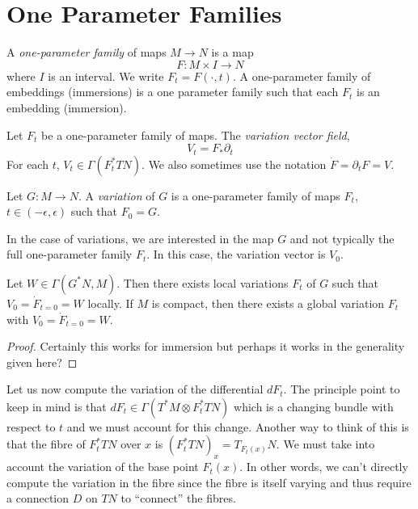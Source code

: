 \section{One Parameter Families}

\begin{defn}
A \emph{one-parameter family} of maps \(M \to N\) is a map
\[
F : M \times I \to N
\]
where \(I\) is an interval. We write \(F_t = F(\cdot, t)\). A one-parameter family of embeddings (immersions) is a one parameter family such that each \(F_t\) is an embedding (immersion).
\end{defn}

\begin{defn}
Let \(F_t\) be a one-parameter family of maps. The \emph{variation vector field},
\[
V_t = F_{\ast} \partial_t
\]
For each \(t\), \(V_t \in \Gamma(F_t^{\ast} TN)\). We also sometimes use the notation \(\dot{F} = \partial_t F = V\).
\end{defn}

\begin{defn}
Let \(G : M \to N\). A \emph{variation} of \(G\) is a one-parameter family of maps \(F_t\), \(t \in (-\epsilon, \epsilon)\) such that \(F_0 = G\).
\end{defn}

In the case of variations, we are interested in the map \(G\) and not typically the full one-parameter family \(F_t\). In this case, the variation vector is \(V_0\).

\begin{lemma}
Let \(W \in \Gamma(G^{\ast} N, M)\). Then there exists local variations \(F_t\) of \(G\) such that \(V_0 = \dot{F}_{t=0} = W\) locally. If \(M\) is compact, then there exists a global variation \(F_t\) with \(V_0 = \dot{F}_{t=0} = W\).
\end{lemma}

\begin{proof}
Certainly this works for immersion but perhaps it works in the generality given here?
\end{proof}

Let us now compute the variation of the differential \(dF_t\). The principle point to keep in mind is that \(dF_t \in \Gamma(T^{\ast} M \otimes F_t^{\ast} TN)\) which is a changing bundle with respect to \(t\) and we must account for this change. Another way to think of this is that the fibre of \(F_t^{\ast} TN\) over \(x\) is \((F_t^{\ast} TN)_x = T_{F_t(x)} N\). We must take into account the variation of the base point \(F_t(x)\). In other words, we can't directly compute the variation in the fibre since the fibre is itself varying and thus require a connection \(D\) on \(TN\) to ``connect'' the fibres.

